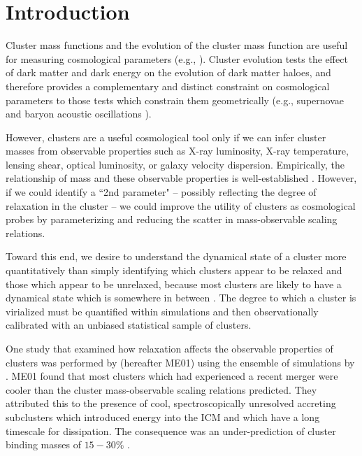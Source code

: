 \documentclass{emulateapj}
\begin{document}


\section{Introduction}\label{sec:intro}

Cluster mass functions and the evolution of the cluster mass function
are useful for measuring cosmological parameters (e.g.,
\cite{1989ApJ...341L..71E, 1998ApJ...508..483W, 2001ApJ...553..545H,
2003PhRvD..67h1304H, 2004PhRvD..70l3008W}). Cluster evolution tests
the effect of dark matter and dark energy on the evolution of dark
matter haloes, and therefore provides a complementary and distinct
constraint on cosmological parameters to those tests which constrain
them geometrically (e.g., supernovae \citep{1998AJ....116.1009R,
2007ApJ...659...98R} and baryon acoustic oscillations
\citep{2005ApJ...633..560E}).

However, clusters are a useful cosmological tool only if we can infer
cluster masses from observable properties such as X-ray luminosity,
X-ray temperature, lensing shear, optical luminosity, or galaxy
velocity dispersion. Empirically, the relationship of mass and these
observable properties is well-established
\citep{2005RvMP...77..207V}. However, if we could identify a ``2nd
parameter" -- possibly reflecting the degree of relaxation in the
cluster -- we could improve the utility of clusters as cosmological
probes by parameterizing and reducing the scatter in mass-observable
scaling relations.

Toward this end, we desire to understand the dynamical state of a
cluster more quantitatively than simply identifying which clusters
appear to be relaxed and those which appear to be unrelaxed, because
most clusters are likely to have a dynamical state which is somewhere
in between \citep{2006ApJ...639...64O, 2006ApJ...650..128K}. The
degree to which a cluster is virialized must be quantified within
simulations and then observationally calibrated with an unbiased
statistical sample of clusters.

One study that examined how relaxation affects the observable
properties of clusters was performed by \cite{2001ApJ...546..100M}
(hereafter ME01) using the ensemble of simulations by
\cite{1997ApJ...491...38M}. ME01 found that most clusters which had
experienced a recent merger were cooler than the cluster
mass-observable scaling relations predicted. They attributed this to the
presence of cool, spectroscopically unresolved accreting subclusters
which introduced energy into the ICM and which have a long timescale for
dissipation. The consequence was an under-prediction of cluster
binding masses of $15-30\%$ \citep{2001ApJ...546..100M}.
\end{document}
